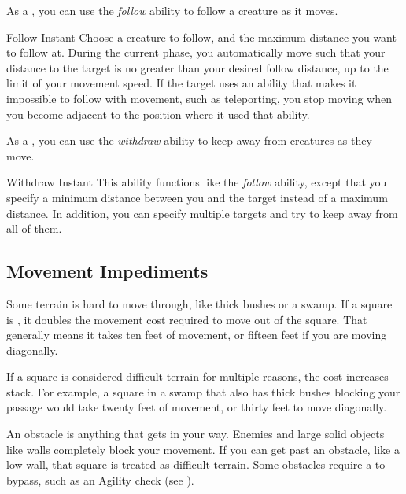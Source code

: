          As a , you can use the \textit{follow} ability to follow a creature as it moves.

        \begin{instantability}{Follow}
            \label{Follow}
            Instant
            \rankline
            Choose a creature to follow, and the maximum distance you want to follow at.
            During the current phase, you automatically move such that your distance to the target is no greater than your desired follow distance, up to the limit of your movement speed.
            If the target uses an ability that makes it impossible to follow with movement, such as teleporting, you stop moving when you become adjacent to the position where it used that ability.
        \end{instantability}

         As a , you can use the \textit{withdraw} ability to keep away from creatures as they move.

        \begin{instantability}{Withdraw}
            \label{Withdraw}
            Instant
            \rankline
            This ability functions like the \textit{follow} ability, except that you specify a minimum distance between you and the target instead of a maximum distance.
            In addition, you can specify multiple targets and try to keep away from all of them.
        \end{instantability}

    \subsection{Movement Impediments}

        \label{Difficult Terrain}
        Some terrain is hard to move through, like thick bushes or a swamp.
        If a square is , it doubles the movement cost required to move out of the square.
        That generally means it takes ten feet of movement, or fifteen feet if you are moving diagonally.

        If a square is considered difficult terrain for multiple reasons, the cost increases stack.
        For example, a square in a swamp that also has thick bushes blocking your passage would take twenty feet of movement, or thirty feet to move diagonally.

        An obstacle is anything that gets in your way. Enemies and large solid objects like walls completely block your movement. If you can get past an obstacle, like a low wall, that square is treated as difficult terrain. Some obstacles require a  to bypass, such as an Agility check (see ).

